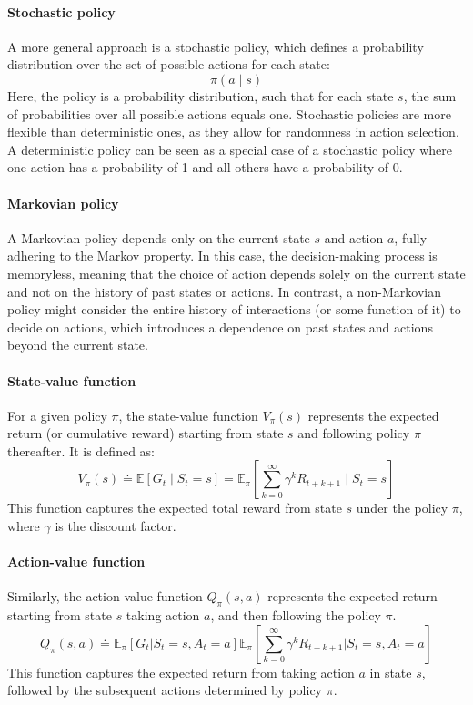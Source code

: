 \paragraph*{Stochastic policy}
A more general approach is a stochastic policy, which defines a probability distribution over the set of possible actions for each state:
\[\pi(a\mid s)\]
Here, the policy is a probability distribution, such that for each state $s$, the sum of probabilities over all possible actions equals one. 
Stochastic policies are more flexible than deterministic ones, as they allow for randomness in action selection. 
A deterministic policy can be seen as a special case of a stochastic policy where one action has a probability of 1 and all others have a probability of 0.

\paragraph*{Markovian policy}
A Markovian policy depends only on the current state $s$ and action $a$, fully adhering to the Markov property. 
In this case, the decision-making process is memoryless, meaning that the choice of action depends solely on the current state and not on the history of past states or actions.
\noindent In contrast, a non-Markovian policy might consider the entire history of interactions (or some function of it) to decide on actions, which introduces a dependence on past states and actions beyond the current state.

\paragraph*{State-value function}
For a given policy $\pi$, the state-value function $V_{\pi}(s)$ represents the expected return (or cumulative reward) starting from state $s$ and following policy $\pi$ thereafter.
It is defined as:
\[V_{\pi}(s) \doteq \mathbb{E}\left[G_t\mid S_t=s\right]=\mathbb{E}_{\pi}\left[\sum_{k=0}^{\infty}\gamma^kR_{t+k+1}\mid S_t=s\right]\]
This function captures the expected total reward from state $s$ under the policy $\pi$, where $\gamma$ is the discount factor.

\paragraph*{Action-value function}
Similarly, the action-value function $Q_{\pi}(s,a)$ represents the expected return starting from state $s$ taking action $a$, and then following the policy $\pi$. 
\[Q_{\pi}(s,a)\doteq\mathbb{E}_{\pi}\left[G_t|S_t=s,A_t=a\right]\mathbb{E}_{\pi}\left[\sum_{k=0}^{\infty}\gamma^kR_{t+k+1}|S_t=s,A_t=a\right]\]
This function captures the expected return from taking action $a$ in state $s$, followed by the subsequent actions determined by policy $\pi$.


